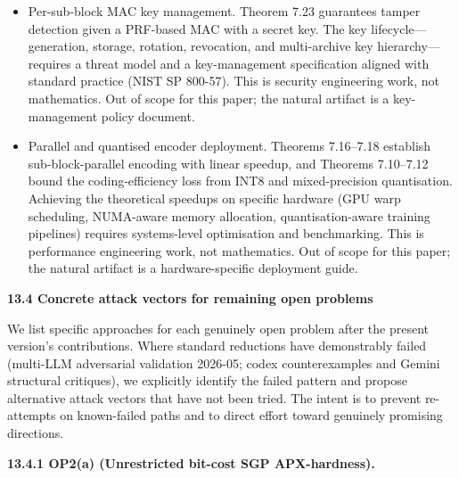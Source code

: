\documentclass[
]{article}
\begin{document}
\begin{itemize}
  7.24 provide formulas for cache hit rates and decoder-latency tail
  bounds under Zipf and IRM workloads, respectively. Selecting an
  appropriate cache size~$C$, eviction policy, and per-workload
  parameters ($\alpha$, request distribution) for a specific deployment
  requires empirical workload profiling and system-level benchmarking.
  This is systems engineering work, not mathematics. Out of scope for
  this paper; the natural artifact is a workload-aware cache
  configuration guide accompanying a reference decoder.
\item
  Per-sub-block MAC key management. Theorem 7.23 guarantees tamper
  detection given a PRF-based MAC with a secret key. The key
  lifecycle---generation, storage, rotation, revocation, and
  multi-archive key hierarchy---requires a threat model and a
  key-management specification aligned with standard practice
  (NIST SP 800-57). This is security engineering work, not mathematics.
  Out of scope for this paper; the natural artifact is a key-management
  policy document.
\item
  Parallel and quantised encoder deployment. Theorems 7.16--7.18
  establish sub-block-parallel encoding with linear speedup, and
  Theorems 7.10--7.12 bound the coding-efficiency loss from INT8 and
  mixed-precision quantisation. Achieving the theoretical speedups on
  specific hardware (GPU warp scheduling, NUMA-aware memory allocation,
  quantisation-aware training pipelines) requires systems-level
  optimisation and benchmarking. This is performance engineering work,
  not mathematics. Out of scope for this paper; the natural artifact is
  a hardware-specific deployment guide.
\end{itemize}

\textbf{13.4 Concrete attack vectors for remaining open problems}

We list specific approaches for each genuinely open problem after the
present version's contributions. Where standard reductions have
demonstrably failed (multi-LLM adversarial validation 2026-05; codex
counterexamples and Gemini structural critiques), we explicitly
identify the failed pattern and propose alternative attack vectors
that have not been tried. The intent is to prevent re-attempts on
known-failed paths and to direct effort toward genuinely promising
directions.

\textbf{13.4.1 OP2(a) (Unrestricted bit-cost SGP APX-hardness).}
\end{document}
